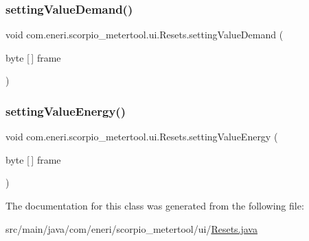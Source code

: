 \subsubsection{\texorpdfstring{setting\+Value\+Demand()}{settingValueDemand()}}
{\footnotesize\ttfamily void com.\+eneri.\+scorpio\+\_\+metertool.\+ui.\+Resets.\+setting\+Value\+Demand (\begin{DoxyParamCaption}\item[{byte \mbox{[}$\,$\mbox{]}}]{frame }\end{DoxyParamCaption})}

\mbox{\label{classcom_1_1eneri_1_1scorpio__metertool_1_1ui_1_1_resets_a28ace340076aba758af4936b2c7bd3cb}} 
\subsubsection{\texorpdfstring{setting\+Value\+Energy()}{settingValueEnergy()}}
{\footnotesize\ttfamily void com.\+eneri.\+scorpio\+\_\+metertool.\+ui.\+Resets.\+setting\+Value\+Energy (\begin{DoxyParamCaption}\item[{byte \mbox{[}$\,$\mbox{]}}]{frame }\end{DoxyParamCaption})}



The documentation for this class was generated from the following file\+:\begin{DoxyCompactItemize}
\item 
src/main/java/com/eneri/scorpio\+\_\+metertool/ui/\hyperlink{_resets_8java}{Resets.\+java}\end{DoxyCompactItemize}
